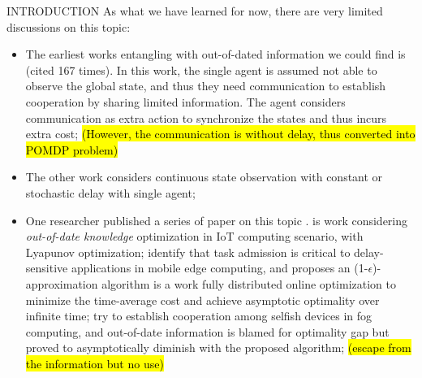 \documentclass[10pt, conference, letterpaper]{IEEEtran}
\begin{document}
\begin{section}{INTRODUCTION}
        As what we have learned for now, there are very limited discussions on this topic:
        \begin{itemize}
            \item The earliest works entangling with out-of-dated information we could find is \cite{ref-01} (cited 167 times). In this work, the single agent is assumed not able to observe the global state, and thus they need communication to establish cooperation by sharing limited information. The agent considers communication as extra action to synchronize the states and thus incurs extra cost; \hl{(However, the communication is without delay, thus converted into POMDP problem)}
            \item The other work \cite{ref-02} considers continuous state observation with constant or stochastic delay with single agent;
            \item One researcher published a series of paper on this topic \cite{Lyu2017,Lyu2018,Lyu2018a,Lyu2018b}.
                \cite{Lyu2017} is work considering \emph{out-of-date knowledge} optimization in IoT computing scenario, with Lyapunov optimization;
                 \cite{Lyu2018} identify that task admission is critical to delay-sensitive applications in mobile edge computing, and proposes an (1-$\epsilon$)-approximation algorithm
                 \cite{Lyu2018a} is a work fully distributed online optimization to minimize the time-average cost and achieve asymptotic optimality over infinite time;
                \cite{Lyu2018b} try to establish cooperation among selfish devices in fog computing, and out-of-date information is blamed for optimality gap but proved to asymptotically diminish with the proposed algorithm; \hl{(escape from the information but no use)}
        \end{itemize}


\end{section}
\end{document}
